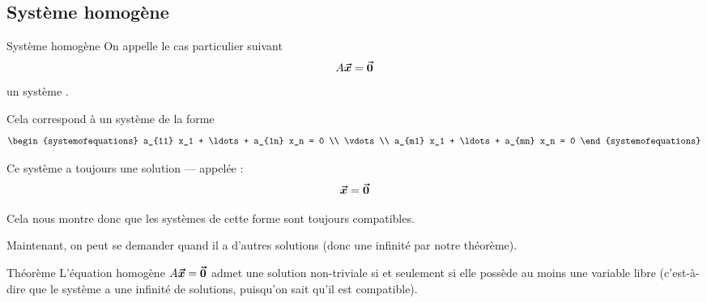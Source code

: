 \documentclass{article}
\begin{document}
\subsection{Système homogène}


\begin{parag}{Système homogène}
    On appelle le cas particulier suivant
    \[A \bm{\protect\vec{x}}= \bm{\protect\vec{0}}\]
    un système .

    Cela correspond à un système de la forme
    \[\begin{systemofequations}
    a_{11} x_1 + \ldots + a_{1n} x_n = 0 \\
    \vdots \\
    a_{m1} x_1 + \ldots + a_{mn} x_n = 0
    \end{systemofequations}\]

    Ce système a toujours une solution --- appelée :
    \[\bm{\protect\vec{x}} = \bm{\protect\vec{0}}\]

    Cela nous montre donc que les systèmes de cette forme sont toujours compatibles.

    Maintenant, on peut se demander quand il a d'autres solutions (donc une infinité par notre théorème).
\end{parag}

\begin{parag}{Théorème}
    L'équation homogène $A \bm{\protect\vec{x}} = \bm{\protect\vec{0}}$ admet une solution non-triviale si et seulement si elle possède au moins une variable libre (c'est-à-dire que le système a une infinité de solutions, puisqu'on sait qu'il est compatible).


\end{parag}
\end{document}
